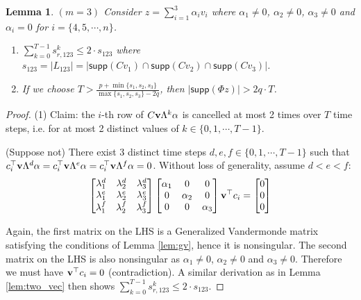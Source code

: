 \documentclass[journal]{IEEEtran}
\newtheorem{lem}{\bf{Lemma}}
\begin{document}
\begin{lem} \label{lem:three_vec}$(m=3)$ Consider $z = \sum_{i=1}^3 \alpha_i v_i $ where $\alpha_1 \neq 0$, $\alpha_2 \neq 0$, $\alpha_3 \neq 0$ and $\alpha_i = 0$ for $i = \{4, 5, \cdots , n\}$.   
\begin{enumerate}
\item 
$\sum_{k=0}^{T-1} s_{r,123}^k \le 2 \cdot s_{123}$ where $s_{123} = \lvert L_{123} \rvert = \lvert \textsf{supp} (Cv_1) \cap \textsf{supp} (Cv_2) \cap \textsf{supp} (Cv_3)  \rvert$.
\item  
If we choose $T > \frac { p + \min \{ s_1, s_2, s_3 \}} { \max \{s_1, s_2, s_3 \} - 2q }$,  then $\lvert \textsf{supp} (\Phi z)\rvert > 2q \cdot T$.
\end{enumerate}
\end{lem}
\begin{proof} (1) Claim: the $i$-th row of $C{\bf v}\Lambda^k \alpha$ is cancelled at most 2 times over $T$ time steps, i.e. for at most 2 distinct values of $k \in \{0, 1, \cdots, T-1\}$. 
	
	(Suppose not) There exist 3 distinct time steps $d, e, f \in \{0, 1, \cdots, T-1\}$ such that $c_i^\top {\bf v} \Lambda^d \alpha = c_i^\top {\bf v} \Lambda^e \alpha = c_i^\top {\bf v} \Lambda^f \alpha = 0$. Without loss of generality, assume $d<e<f$:
	\begin{equation}
		\begin{bmatrix} \lambda_1^d & \lambda_2^d & \lambda_3^d \\
					\lambda_1^e & \lambda_2^e & \lambda_3^e \\
					\lambda_1^f & \lambda_2^f & \lambda_3^f 
		\end{bmatrix}
		\begin{bmatrix} \alpha_1 & 0 & 0 \\ 0 & \alpha_2 & 0 \\ 0 & 0 & \alpha_3 \end{bmatrix} {\bf v}^\top c_i 
		= \begin{bmatrix} 0 \\ 0 \\ 0 \end{bmatrix} \nonumber
	\end{equation}
	
Again, the first matrix on the LHS is a Generalized Vandermonde matrix satisfying the conditions of Lemma \ref{lem:gv}, hence it is nonsingular. The second matrix on the LHS is also nonsingular as $\alpha_1 \neq 0$, $\alpha_2 \neq 0$ and $\alpha_3 \neq 0$. Therefore we must have ${\bf v} ^\top c_i =0 $ (contradiction). A similar derivation as in Lemma \ref{lem:two_vec} then shows $\sum_{k=0}^{T-1} s_{r,123}^k \le 2 \cdot s_{123}$. 


\end{proof}
\end{document}
